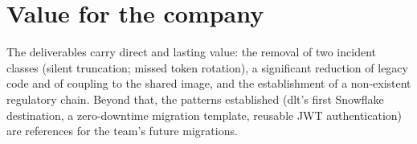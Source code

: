 \section{Value for the company}

The deliverables carry direct and lasting value: the removal of two incident classes (silent truncation; missed token rotation), a significant reduction of legacy code and of coupling to the shared image, and the establishment of a non-existent regulatory chain. Beyond that, the patterns established (dlt's first Snowflake destination, a zero-downtime migration template, reusable JWT authentication) are references for the team's future migrations.

